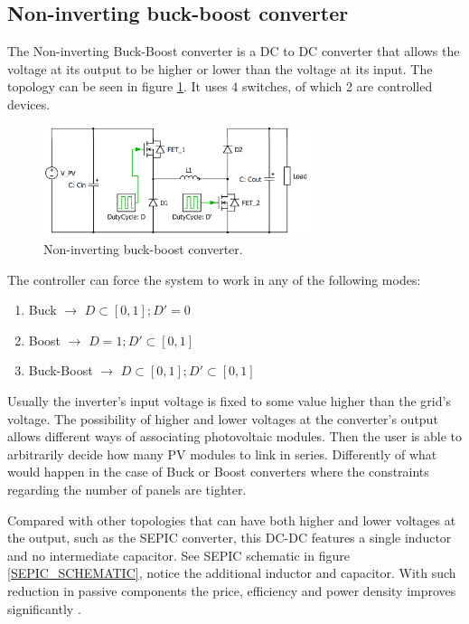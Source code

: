 
\subsection{Non-inverting buck-boost converter\label{N_INV_BB}}
		
The Non-inverting Buck-Boost converter is a DC to DC converter that allows the voltage at its output to be higher or lower than the voltage at its input. The topology can be seen in figure \ref{N_INV_BB_SCHEMATIC}. It uses 4 switches, of which 2 are controlled devices. 
		

\begin{figure}[htbp]
	\begin{center}
	\includegraphics[width=0.7\textwidth]{../Pictures/2_d_H_B_BB}
	\caption{Non-inverting buck-boost converter.}
	\label{N_INV_BB_SCHEMATIC}
	\end{center}	
\end{figure}

		
The controller can force the system to work in any of the following modes:

\begin{enumerate}
	\item Buck $\rightarrow$ $ D \subset [0,1];	 D' = 0 $
	\item Boost $\rightarrow$ $ D = 1;	 D' \subset [0,1] $
	\item Buck-Boost $\rightarrow$ $ D \subset [0,1]; D' \subset [0,1] $
\end{enumerate}
		
Usually the inverter's input voltage is fixed to some value higher than the grid's voltage. The possibility of higher and lower voltages at the converter's output allows different ways of associating photovoltaic modules. Then the user is able to arbitrarily decide how many PV modules to link in series. Differently of what would happen in the case of Buck or Boost converters where the constraints regarding the number of panels are tighter.
		
Compared with other topologies that can have both higher and lower voltages at the output, such as the SEPIC converter, this DC-DC features a single inductor and no intermediate capacitor. See SEPIC schematic in figure \ref{SEPIC_SCHEMATIC}, notice the additional inductor and capacitor. With such reduction in passive components the price, efficiency and power density improves significantly \cite{underthehood}.

